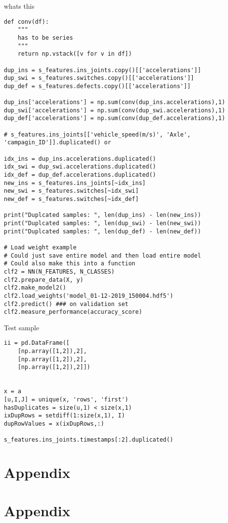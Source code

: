 whats this
\begin{verbatim}
def conv(df):
    """
    has to be series
    """
    return np.vstack([v for v in df])

dup_ins = s_features.ins_joints.copy()[['accelerations']]
dup_swi = s_features.switches.copy()[['accelerations']]
dup_def = s_features.defects.copy()[['accelerations']]

dup_ins['accelerations'] = np.sum(conv(dup_ins.accelerations),1)
dup_swi['accelerations'] = np.sum(conv(dup_swi.accelerations),1)
dup_def['accelerations'] = np.sum(conv(dup_def.accelerations),1)

# s_features.ins_joints[['vehicle_speed(m/s)', 'Axle', 'campagin_ID']].duplicated() or

idx_ins = dup_ins.accelerations.duplicated()
idx_swi = dup_swi.accelerations.duplicated()
idx_def = dup_def.accelerations.duplicated()
new_ins = s_features.ins_joints[~idx_ins]
new_swi = s_features.switches[~idx_swi]
new_def = s_features.switches[~idx_def]

print("Duplcated samples: ", len(dup_ins) - len(new_ins))
print("Duplcated samples: ", len(dup_swi) - len(new_swi))
print("Duplcated samples: ", len(dup_def) - len(new_def))

# Load weight example 
# Could just save entire model and then load entire model
# Could also make this into a function
clf2 = NN(N_FEATURES, N_CLASSES)
clf2.prepare_data(X, y)
clf2.make_model2()
clf2.load_weights('model_01-12-2019_150004.hdf5')
clf2.predict() ### on validation set
clf2.measure_performance(accuracy_score)
\end{verbatim}

Test sample
\begin{verbatim}
ii = pd.DataFrame([
    [np.array([1,2]),2], 
    [np.array([1,2]),2], 
    [np.array([1,2]),2]])
    
    
x = a
[u,I,J] = unique(x, 'rows', 'first')
hasDuplicates = size(u,1) < size(x,1)
ixDupRows = setdiff(1:size(x,1), I)
dupRowValues = x(ixDupRows,:)

s_features.ins_joints.timestamps[:2].duplicated()
\end{verbatim}

\chapter{Appendix}

\newpage
\cleardoublepage
\appendix
\chapter{Appendix}
\label{code}
\inputminted[linenos, fontsize = \scriptsize]{haskell}{../src/utils/defect_utils.py}


